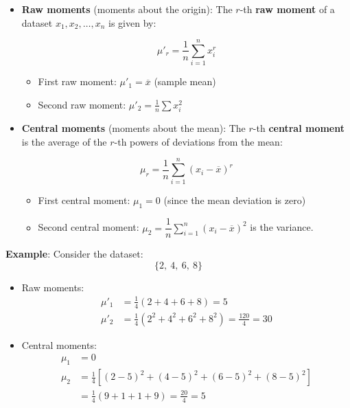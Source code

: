 \documentclass[twoside]{book}
\begin{document}
\begin{itemize}
    \item \textbf{Raw moments} (moments about the origin): The $r$-th \textbf{raw moment} of a dataset $x_1, x_2, \dots, x_n$ is given by:
\begin{textbox}
\[
\mu'_r = \frac{1}{n} \sum_{i=1}^{n} x_i^r
\]
\end{textbox}
    \begin{itemize}
        \item First raw moment: $\mu'_1 = \overline{x}$ (sample mean)
        \item Second raw moment: $\mu'_2 = \frac{1}{n} \sum x_i^2$
    \end{itemize}
    \item \textbf{Central moments} (moments about the mean): The $r$-th \textbf{central moment} is the average of the $r$-th powers of deviations from the mean:
\begin{textbox}
\[
\mu_r = \frac{1}{n} \sum_{i=1}^{n} (x_i - \overline{x})^r
\]
\end{textbox}
\begin{itemize}
    \item First central moment: $\mu_1 = 0$ (since the mean deviation is zero)
    \item Second central moment: $\mu_2 = \dfrac{1}{n} \sum_{i=1}^{n} (x_i - \overline{x})^2$ is the {variance}.
\end{itemize}
\end{itemize}

\textbf{Example}: Consider the dataset:
\[
\{2,\ 4,\ 6,\ 8\}
\]
\begin{itemize}
\item{Raw moments:}
\begin{align*}
\mu'_1 &= \frac{1}{4}(2 + 4 + 6 + 8) = 5 \\
\mu'_2 &= \frac{1}{4}(2^2 + 4^2 + 6^2 + 8^2) = \frac{120}{4} = 30
\end{align*}

\item{Central moments:}
\begin{align*}
\mu_1 &= 0\\
\mu_2 &= \frac{1}{4}[(2 - 5)^2 + (4 - 5)^2 + (6 - 5)^2 + (8 - 5)^2] \\
      &= \frac{1}{4}(9 + 1 + 1 + 9) = \frac{20}{4} = 5
\end{align*}

\end{itemize}
\end{document}
